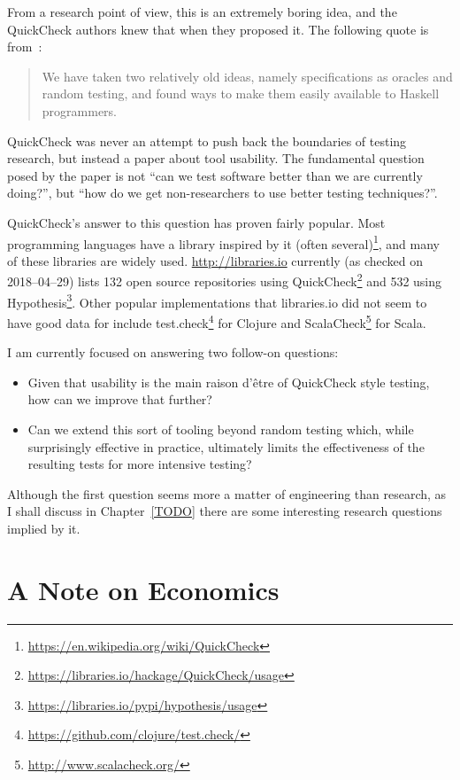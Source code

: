From a research point of view,
this is an extremely boring idea,
and the QuickCheck authors knew that when they proposed it.
The following quote is from~\cite{DBLP:conf/icfp/ClaessenH00}:

\begin{quote}
We have taken two relatively old ideas, namely specifications
as oracles and random testing, and found ways to make
them easily available to Haskell programmers.
\end{quote}

QuickCheck was never an attempt to push back the boundaries of testing research,
but instead a paper about tool usability.
The fundamental question posed by the paper is not ``can we test software better than we are currently doing?'',
but ``how do we get non-researchers to use better testing techniques?''.

QuickCheck's answer to this question has proven fairly popular.
Most programming languages have a library inspired by it (often several)\footnote{\url{https://en.wikipedia.org/wiki/QuickCheck}},
and many of these libraries are widely used.
\url{http://libraries.io} currently (as checked on 2018--04--29) lists 132 open source repositories using QuickCheck\footnote{\url{https://libraries.io/hackage/QuickCheck/usage}} and 532 using Hypothesis\footnote{\url{https://libraries.io/pypi/hypothesis/usage}}.
Other popular implementations that libraries.io did not seem to have good data for include test.check\footnote{\url{https://github.com/clojure/test.check/}} for Clojure and ScalaCheck\footnote{\url{http://www.scalacheck.org/}} for Scala.

I am currently focused on answering two follow-on questions:

\begin{itemize}
\item Given that usability is the main raison d'être of QuickCheck style testing,
how can we improve that further?
\item Can we extend this sort of tooling beyond random testing which,
while surprisingly effective in practice,
ultimately limits the effectiveness of the resulting tests for more intensive testing?
\end{itemize}

Although the first question seems more a matter of engineering than research,
as I shall discuss in Chapter~\ref{TODO} there are some interesting research questions implied by it.

\chapter{A Note on Economics}

